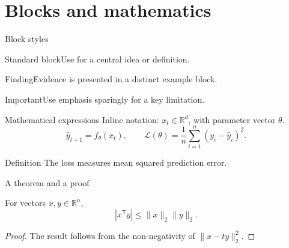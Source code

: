 \documentclass[aspectratio=43]{beamer}
\begin{document}
\section{Blocks and mathematics}
\begin{frame}{Block styles}
  \begin{block}{Standard block}Use for a central idea or definition.\end{block}
  \begin{exampleblock}{Finding}Evidence is presented in a distinct example block.\end{exampleblock}
  \begin{alertblock}{Important}Use emphasis sparingly for a key limitation.\end{alertblock}
\end{frame}
\begin{frame}{Mathematical expressions}
  Inline notation: $x_t \in \mathbb{R}^{d}$, with parameter vector $\theta$.
  \begin{equation}
    \hat{y}_{t+1}=f_{\theta}(x_t), \qquad
    \mathcal{L}(\theta)=\frac{1}{n}\sum_{i=1}^{n}(y_i-\hat{y}_i)^2.
  \end{equation}
  \begin{block}{Definition}
    The loss measures mean squared prediction error.
  \end{block}
\end{frame}
\begin{frame}{A theorem and a proof}
  \begin{theorem}
    For vectors $x,y\in\mathbb{R}^{n}$,
    \[
      |x^{\mathsf T}y|\leq \lVert x\rVert_2\lVert y\rVert_2.
    \]
  \end{theorem}
  \begin{proof}
    The result follows from the non-negativity of $\lVert x-ty\rVert_2^2$.
  \end{proof}
\end{frame}
\end{document}
